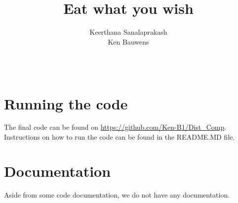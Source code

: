 \documentclass{article}
\title{Eat what you wish}
\author{Keerthana Sanalaprakash \\ Ken Bauwens \\ \\ \\}
\date{}
\begin{document}
\maketitle
\section{Running the code}
The final code can be found on \url{https://github.com/Ken-B1/Dist_Comp}. Instructions on how to run the code can be found in the README.MD file.
\section{Documentation}
Aside from some code documentation, we do not have any documentation.
\end{document}
